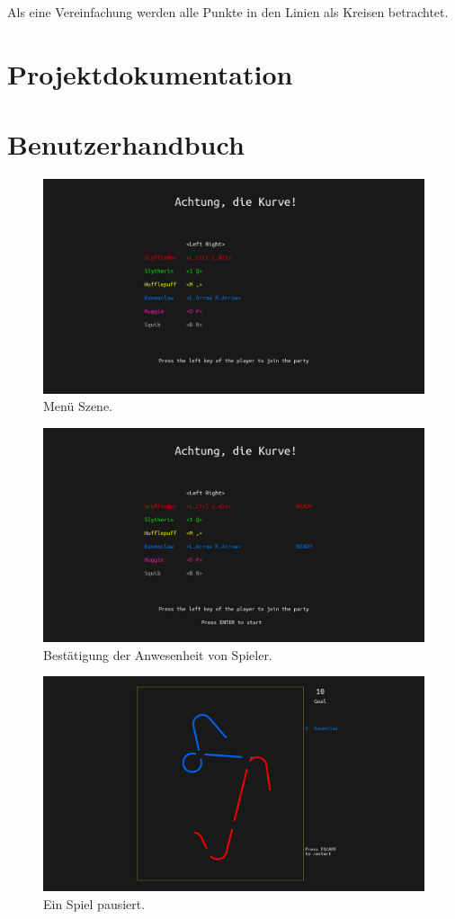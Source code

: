 \documentclass[doktyp=studarbeit]{TUBAFarbeiten}
\begin{document}
Als eine Vereinfachung werden alle Punkte in den Linien als Kreisen betrachtet.

\section{Projektdokumentation}

\section{Benutzerhandbuch}

\begin{figure}[!htb]
	\centering
	\includegraphics[width=0.8\linewidth]{1.png}
	\caption{Menü Szene.}
	\label{fig:menu}
\end{figure}

\begin{figure}[!htb]
	\centering
	\includegraphics[width=0.8\linewidth]{2.png}
	\caption{Bestätigung der Anwesenheit von Spieler.}
	\label{fig:confirmation}
\end{figure}

\begin{figure}[!htb]
	\centering
	\includegraphics[width=0.8\linewidth]{5.png}
	\caption{Ein Spiel pausiert.}
	\label{fig:pause}
\end{figure}


\printbibliography[heading=bibintoc]
\end{document}

